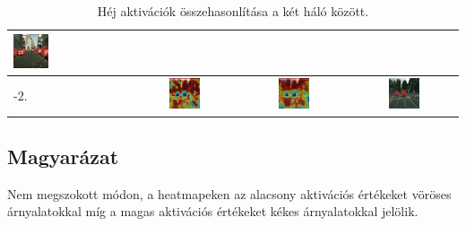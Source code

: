\documentclass[12pt,oneside,a4paper]{article}
\theoremstyle{remark}
\begin{document}
\begin{table}[h!]
\begin{tabular}{|p{}|c|c|c|}
        \includegraphics[width=0.316\textwidth]{bonn_000002_000019_leftImg8bit} \\
        \hline
        -2.&\includegraphics[width=0.316\textwidth]{old_layer-2} &
        \includegraphics[width=0.316\textwidth]{new_l-2} &
        \includegraphics[width=0.316\textwidth]{bonn_000001_000019_leftImg8bit} \\
        \hline
    \end{tabular}
    \caption{Héj aktivációk összehasonlítása a két háló között.}
    \label{tab:Activations}
\end{table}


\subsection{Magyarázat}\label{subsec:magyarazat}
Nem megszokott módon, a heatmapeken az alacsony aktivációs értékeket vöröses árnyalatokkal míg a magas aktivációs értékeket
kékes árnyalatokkal jelölik.
\end{document}
